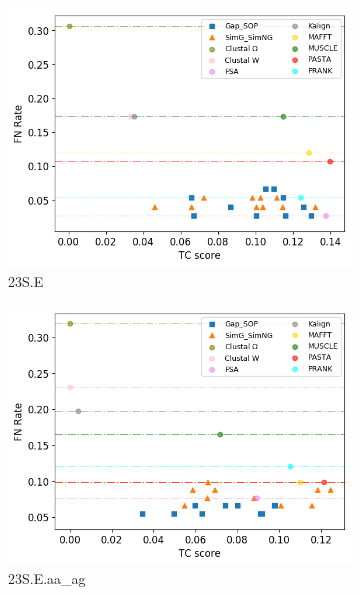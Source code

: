 \begin{figure}[!htbp]
	\centering
	\begin{adjustwidth}{-0.2cm}{}
		\begin{subfigure}{0.5\columnwidth}
			\includegraphics[width=\columnwidth]{Figure/summary/precomputedInit/23S.E/fnrate_vs_tc}
			\caption{23S.E}
		\end{subfigure}	
		\begin{subfigure}{0.5\columnwidth}
			\includegraphics[width=\columnwidth]{Figure/summary/precomputedInit/23S.E.aa_ag/fnrate_vs_tc}
			\caption{23S.E.aa\_ag}
		\end{subfigure}
		\begin{subfigure}{0.5\columnwidth}

\end{subfigure}
\end{adjustwidth}
\end{figure}

